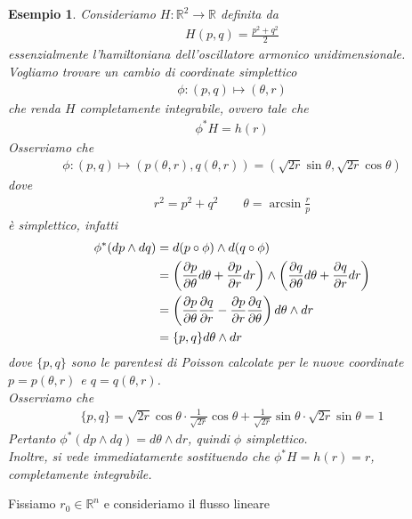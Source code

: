 \documentclass[twoside, 11pt]{amsbook}
\newcommand{\0}{{(0)}}
\newcommand{\3}{{(3)}}
\theoremstyle{colonplain}
\theoremstyle{colondefinition}
\newtheorem{ex}[thm]{Esempio}
\theoremstyle{colonremark}
\numberwithin{equation}{chapter}
\begin{document}
\begin{ex}
Consideriamo $H : \mathbb{R}^{2} \longrightarrow \mathbb{R}$ definita da
\begin{align}
    H(p, q) = \frac{p^2 + q^2}{2}
\end{align}
essenzialmente l'hamiltoniana dell'oscillatore armonico unidimensionale. \\
Vogliamo trovare un cambio di coordinate simplettico
\begin{align}
    \phi : (p, q) \mapsto (\theta, r)
\end{align}
che renda $H$ completamente integrabile, ovvero tale che
\begin{align}
    \phi^*H = h(r)
\end{align}
Osserviamo che
\begin{align}
    \phi : (p, q) \mapsto (p(\theta, r), q(\theta, r)) = (\sqrt{2r}\sin\theta, \sqrt{2r}\cos\theta)
\end{align}
dove
\begin{align}
    r^2 = p^2 + q^2 \qquad \theta = \arcsin \frac{r}{p}
\end{align}
è simplettico, infatti
\begin{align}
    \phi^*(dp \wedge dq) &=  d(p \circ \phi) \wedge d(q \circ \phi) \notag \\
    &= \left(\frac{\partial p}{\partial \theta}d\theta + \frac{\partial p}{\partial r}dr\right) \wedge \left(\frac{\partial q}{\partial \theta}d\theta + \frac{\partial q}{\partial r}dr\right) \notag \\
    &= \left(\frac{\partial p}{\partial \theta}\frac{\partial q}{\partial r} - \frac{\partial p}{\partial r}\frac{\partial q}{\partial \theta}\right)d\theta \wedge dr \notag \\
    &= \{p, q\}d\theta \wedge dr
\end{align}
dove $\{p, q\}$ sono le parentesi di Poisson calcolate per le nuove coordinate $p = p(\theta, r)$ e $q = q(\theta, r)$. \\
Osserviamo che
\begin{align}
    \{p, q\} = \sqrt{2r}\cos\theta \cdot \frac{1}{\sqrt{2r}}\cos\theta + \frac{1}{\sqrt{2r}}\sin\theta \cdot \sqrt{2r}\sin\theta = 1
\end{align}
Pertanto $\phi^*(dp \wedge dq) = d\theta \wedge dr$, quindi $\phi$ simplettico. \\
Inoltre, si vede immediatamente sostituendo che $\phi^*H = h(r) = r$, completamente integrabile.
\end{ex}
Fissiamo $r_0 \in \mathbb{R}^n$ e consideriamo il flusso lineare
\end{document}
